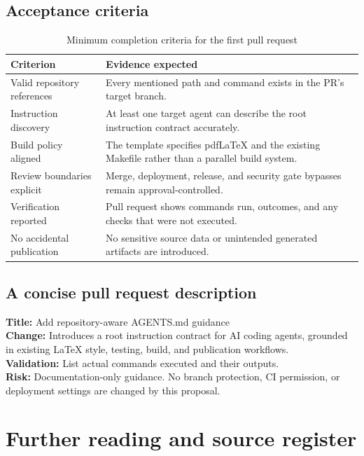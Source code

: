 \documentclass[11pt,letterpaper]{article}
\begin{document}
\subsection{Acceptance criteria}
\begin{table}[htbp]
\small
\centering
\caption{Minimum completion criteria for the first pull request}
\begin{tabularx}{\textwidth}{@{}p{}X@{}}
\toprule
\textbf{Criterion} & \textbf{Evidence expected} \\
\midrule
Valid repository references & Every mentioned path and command exists in the PR's target branch. \\
Instruction discovery & At least one target agent can describe the root instruction contract accurately. \\
Build policy aligned & The template specifies pdfLaTeX and the existing Makefile rather than a parallel build system. \\
Review boundaries explicit & Merge, deployment, release, and security gate bypasses remain approval-controlled. \\
Verification reported & Pull request shows commands run, outcomes, and any checks that were not executed. \\
No accidental publication & No sensitive source data or unintended generated artifacts are introduced. \\
\bottomrule
\end{tabularx}
\end{table}

\subsection{A concise pull request description}
\begin{neutralbox}
\textbf{Title:} Add repository-aware AGENTS.md guidance\\[3pt]
\textbf{Change:} Introduces a root instruction contract for AI coding agents, grounded in existing LaTeX style, testing, build, and publication workflows.\\[3pt]
\textbf{Validation:} List actual commands executed and their outputs.\\[3pt]
\textbf{Risk:} Documentation-only guidance. No branch protection, CI permission, or deployment settings are changed by this proposal.
\end{neutralbox}

\section{Further reading and source register}
\end{document}
